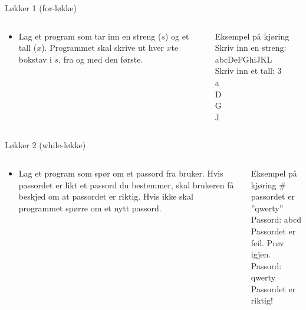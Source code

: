 \documentclass[screen, aspectratio=169]{beamer}
\begin{document}
\begin{frame}{Løkker 1 (for-løkke)}
	\begin{columns}
		\begin{column}{.6\textwidth}
			\begin{itemize}
				\item Lag et program som tar inn en streng ($s$) og et tall ($x$). Programmet skal skrive ut hver $x$te bokstav i $s$, fra og med den første.
			\end{itemize}
		\end{column}
		\begin{column}{.4\textwidth}
			\begin{exampleblock}{Eksempel på kjøring}
				Skriv inn en streng: \textcolor{input-color}{abcDeFGhiJKL}\\
				Skriv inn et tall: \textcolor{input-color}{3}\\
				\vspace{1em}
				a\\
				D\\
				G\\
				J
			\end{exampleblock}
		\end{column}
	\end{columns}
\end{frame}

\begin{frame}{Løkker 2 (while-løkke)}
	\begin{columns}
		\begin{column}{.6\textwidth}
			\begin{itemize}
				\item Lag et program som spør om et passord fra bruker. Hvis passordet er likt et passord du bestemmer, skal brukeren få beskjed om at passordet er riktig. Hvis ikke skal programmet spørre om et nytt passord.
			\end{itemize}
		\end{column}
		\begin{column}{.4\textwidth}
			\begin{exampleblock}{Eksempel på kjøring}
				\textcolor{comment-color}{\# passordet er ''qwerty''}\\
				Passord: \textcolor{input-color}{abcd}\\
				Passordet er feil. Prøv igjen.\\
				Passord: \textcolor{input-color}{qwerty}\\
				Passordet er riktig!
			\end{exampleblock}
		\end{column}
	\end{columns}
\end{frame}
\end{document}
